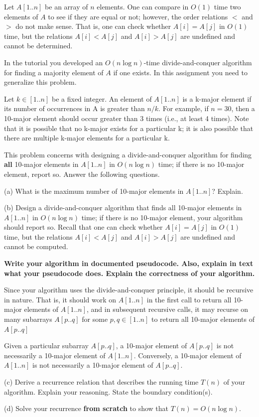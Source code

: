 \documentclass[10pt]{article}
\begin{document}
\begin{Problem}
	
	Let $A[1..n]$ be an array of $n$ elements. One can compare in $O(1)$ time two elements of $A$ to see if they are equal or not; however,
	the order relations $<$ and $>$ do not make sense. That is, one can check whether $A[i] = A[j]$ in $O(1)$ time, but the relations $A[i] < A[j]$ and $A[i] > A[j]$ are undefined and cannot be determined.
	
	\noindent In the tutorial you developed an $O(n\log n)$-time divide-and-conquer algorithm for finding a majority element of $A$ if one exists. In this assignment you need to generalize this problem.
	
	\noindent Let $k\in [1..n]$ be a fixed integer. An element of $A[1..n]$ is a k-major element if its number of occurrences in A is greater than $n/k$. For example, if $n = 30$, then a 10-major element should occur greater than 3 times (i.e., at least 4 times). Note that it is possible that no k-major exists for a particular k; it is also possible that there are multiple k-major elements for a particular k.
	
	\noindent This problem concerns with designing a divide-and-conquer algorithm for finding \textbf{all} 10-major elements in $A[1..n]$ in $O(n\log n)$ time; if there is no 10-major element, report so. Answer the following questions.
	
	(a) What is the maximum number of 10-major elements in
	$A[1..n]$? Explain.
	
	(b) Design a divide-and-conquer algorithm that finds all 10-major elements in $A[1..n]$ in $O(n\log n)$ time; if there is no 10-major element, your algorithm should report so. Recall that one can check whether $A[i] = A[j]$ in $O(1)$ time, but the relations $A[i] < A[j]$ and $A[i] > A[j]$ are undefined and cannot be computed.
	
	\noindent \textbf{Write your algorithm in documented pseudocode. Also, explain in text what your pseudocode does. Explain the correctness of your algorithm.}
	
	\noindent Since your algorithm uses the divide-and-conquer principle, it should
	be recursive in nature. That is, it should work on $A[1..n]$ in the
	first call to return all 10-major elements of $A[1..n]$, and in subsequent recursive calls, it may recurse on many subarrays $A[p..q]$ for some $p, q\in [1..n]$ to return all 10-major elements of $A[p..q]$
	
	\noindent Given a particular subarray $A[p..q]$, a 10-major element of $A[p..q]$ is not necessarily a 10-major element of $A[1..n]$. Conversely, a 10-major element of $A[1..n]$ is not necessarily a 10-major element of $A[p..q]$.
	
	(c) Derive a recurrence relation that describes the running time $T(n)$ of your algorithm. Explain your reasoning. State the boundary condition(s).
	
	(d) Solve your recurrence \textbf{from scratch} to show that $T(n) = O(n\log n)$.
	
\end{Problem}
\end{document}
